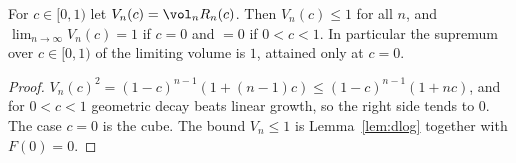 \begin{theorem}\label{thm:main}
For $c\in[0,1)$ let $V_n(c)=\vol_nR_n(c)$. Then $V_n(c)\le1$ for all $n$, and $\lim_{n\to\infty}V_n(c)=1$ if $c=0$ and $=0$ if $0<c<1$.
In particular the supremum over $c\in[0,1)$ of the limiting volume is $1$, attained only at $c=0$.
\end{theorem}
\begin{proof}
$V_n(c)^2=(1-c)^{n-1}(1+(n-1)c)\le(1-c)^{n-1}(1+nc)$, and for $0<c<1$ geometric decay beats linear growth, so the right side tends to $0$.
The case $c=0$ is the cube. The bound $V_n\le1$ is Lemma~\ref{lem:dlog} together with $F(0)=0$.
\end{proof}

